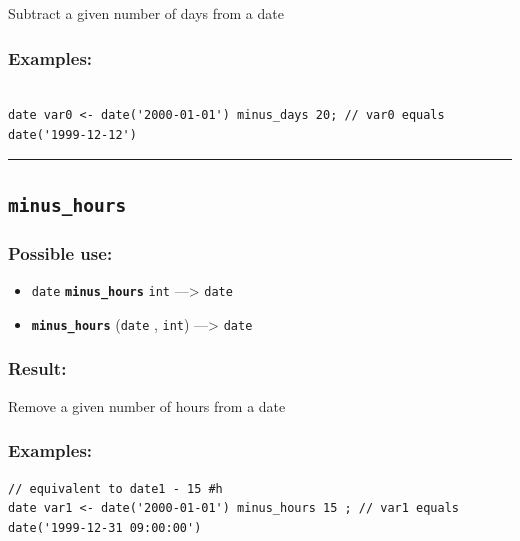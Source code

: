 \documentclass[]{book}
\providecommand{\tightlist}{%
  \setlength{\itemsep}{0pt}\setlength{\parskip}{0pt}}
\theoremstyle{definition}
\theoremstyle{definition}
\theoremstyle{definition}
\theoremstyle{remark}
\begin{document}
Subtract a given number of days from a date

\subsubsection{Examples:}\label{examples-243}

\begin{verbatim}
 
date var0 <- date('2000-01-01') minus_days 20; // var0 equals date('1999-12-12')
\end{verbatim}

\begin{center}\rule{0.5\linewidth}{\linethickness}\end{center}

\subsection{\texorpdfstring{\texttt{minus\_hours}}{minus\_hours}}\label{minus_hours}

\subsubsection{Possible use:}\label{possible-use-354}

\begin{itemize}
\tightlist
\item
  \texttt{date} \textbf{\texttt{minus\_hours}} \texttt{int}
  ---\textgreater{} \texttt{date}
\item
  \textbf{\texttt{minus\_hours}} (\texttt{date} , \texttt{int})
  ---\textgreater{} \texttt{date}
\end{itemize}

\subsubsection{Result:}\label{result-343}

Remove a given number of hours from a date

\subsubsection{Examples:}\label{examples-244}

\begin{verbatim}
// equivalent to date1 - 15 #h  
date var1 <- date('2000-01-01') minus_hours 15 ; // var1 equals date('1999-12-31 09:00:00')
\end{verbatim}
\end{document}
